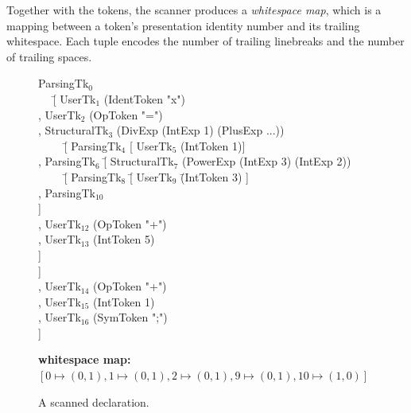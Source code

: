 \documentclass[12pt]{article}
\begin{document}
Together with the tokens, the scanner produces a {\em whitespace map}, which is a mapping between a token's presentation identity number and its trailing whitespace. Each tuple encodes the number of trailing linebreaks and the number of trailing spaces. 


\begin{figure}
\begin{footnotesize}
\begin{center}
\begin{tabbedCode}
ParsingTk$_0$ \= \\
~~ \= [ UserTk$_1$ (IdentToken "x") \\
   \> , UserTk$_2$ (OpToken "=") \\
   \> , StructuralTk$_3$ (DivExp (IntExp 1) (PlusExp ...))\\
   \> ~~~~ \= [ ParsingTk$_4$ [ UserTk$_5$ (IntToken 1)] \\
   \>      \> , ParsingTk$_6$ \= [ StructuralTk$_7$ (PowerExp (IntExp 3) (IntExp 2))\\
   \>      \>              \> ~~~~ \= [ ParsingTk$_8$    \= [ UserTk$_9$ \= (IntToken 3) ] \\
   \>      \>              \>      \> , ParsingTk$_{10}$  \\
   \>      \>              \>      \> ] \\
   \>      \>              \> , UserTk$_{12}$ (OpToken "+") \\
   \>      \>              \> , UserTk$_{13}$ (IntToken 5) \\
   \>      \>              \> ] \\
   \>      \> ] \\
   \> , UserTk$_{14}$ (OpToken "+") \\
   \> , UserTk$_{15}$ (IntToken 1) \\
   \> , UserTk$_{16}$ (SymToken ";") \\
   \> ] \\
\end{tabbedCode}
\end{center}
{\bf whitespace map:} $[ 0 \mapsto (0,1), 1 \mapsto (0,1), 2 \mapsto (0,1), 9 \mapsto (0,1), 10 \mapsto (1,0) ]$
\end{footnotesize}
\caption{A scanned declaration.} \label{fig:scanResult} 
\end{figure}

\end{document}
